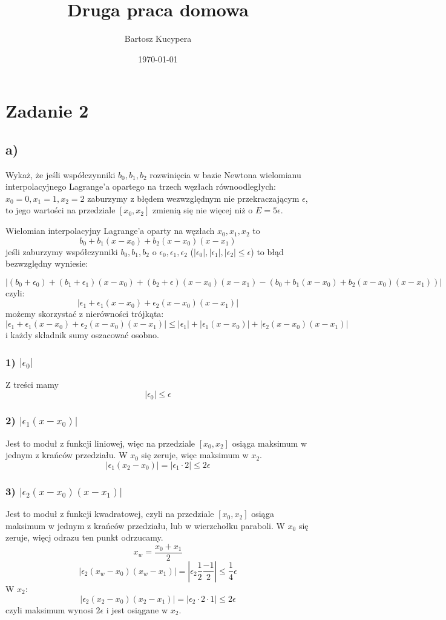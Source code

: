 \documentclass{article}
\title{Druga praca domowa}
\author{Bartosz Kucypera}
\date{\today}
\begin{document}
\maketitle

\section*{Zadanie 2}
\subsection*{a)}
Wykaż, że jeśli współczynniki $b_0, b_1, b_2$ rozwinięcia w bazie Newtona wielomianu interpolacyjnego Lagrange'a opartego na trzech węzłach równoodległych: $x_0=0, x_1 =1,x_2 =2$ zaburzymy z błędem wezwzględnym nie przekraczającym $\epsilon$, to jego wartości na przedziale $[x_0, x_2]$ zmienią się nie więcej niż o $E=5\epsilon$.

Wielomian interpolacyjny Lagrange'a oparty na węzłach $x_0, x_1, x_2$ to
$$b_0 + b_1(x-x_0) + b_2(x-x_0)(x-x_1)$$
jeśli zaburzymy współczynniki $b_0,b_1,b_2$ o $\epsilon_0, \epsilon_1, \epsilon_2$ ($|\epsilon_0|, |\epsilon_1|, |\epsilon_2| \le \epsilon $) to błąd bezwzględny wyniesie:

$$\left|(b_0+\epsilon_0) + (b_1+\epsilon_1)(x-x_0) + (b_2+\epsilon)(x-x_0)(x-x_1) - \left(b_0 + b_1(x-x_0) + b_2(x-x_0)(x-x_1)\right) \right| $$
czyli:
$$\left|\epsilon_1 + \epsilon_1(x-x_0) + \epsilon_2(x-x_0)(x-x_1)\right|$$
możemy skorzystać z nierówności trójkąta:
$$\left|\epsilon_1 + \epsilon_1(x-x_0) + \epsilon_2(x-x_0)(x-x_1)\right| \le |\epsilon_1| + |\epsilon_1(x-x_0)| + |\epsilon_2(x-x_0)(x-x_1)|  $$
i każdy składnik sumy oszacować osobno.
\subsubsection*{1) $|\epsilon_0|$}
Z treści mamy 
$$|\epsilon_0| \le \epsilon$$
\subsubsection*{2) $|\epsilon_1(x-x_0)|$}
Jest to moduł z funkcji liniowej, więc na przedziale $[x_0,x_2]$ osiąga maksimum w jednym z krańców przedziału. W $x_0$ się zeruje, więc maksimum w $x_2$.
$$|\epsilon_1(x_2-x_0)| = |\epsilon_1\cdot2| \le 2\epsilon$$

\subsubsection*{3) $|\epsilon_2(x-x_0)(x-x_1)|$}
Jest to moduł z funkcji kwadratowej, czyli na przedziale $[x_0, x_2]$ osiąga maksimum w jednym z krańców przedziału, lub w wierzchołku paraboli. W $x_0$ się zeruje, więcj odrazu ten punkt odrzucamy.
$$x_w = \frac{x_0 + x_1}{2}$$
$$|\epsilon_2(x_w-x_0)(x_w-x_1)| = \left|\epsilon_2\frac{1}{2}\frac{-1}{2}\right| \le \frac{1}{4}\epsilon$$
W $x_2$:
$$|\epsilon_2(x_2-x_0)(x_2-x_1)| = |\epsilon_2\cdot2\cdot1| \le 2\epsilon$$
czyli maksimum wynosi $2\epsilon$ i jest osiągane w $x_2$.
\end{document}
